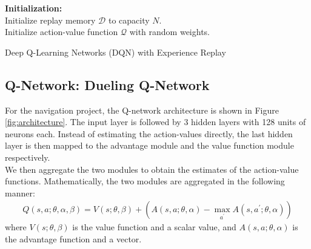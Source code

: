 \documentclass[12pt,twoside]{article}
\begin{document}
\begin{algorithm}[H]

\SetAlgoLined
\textbf{Initialization:}\\
Initialize replay memory $\mathcal{D}$ to capacity $N$.\\
Initialize action-value function $\mathcal{Q}$ with random weights.\

 \caption{Deep Q-Learning Networks (DQN) with Experience Replay}
\end{algorithm}

\subsection{Q-Network: Dueling Q-Network}

For the navigation project, the Q-network architecture is shown in Figure \ref{fig:architecture}. The input layer is followed by 3 hidden layers with 128 units of neurons each. Instead of estimating the action-values directly, the last hidden layer is then mapped to the advantage module and the value function module respectively. \\

We then aggregate the two modules to obtain the estimates of the action-value functions. Mathematically, the two modules are aggregated in the following manner:
\begin{align*}
	Q(s,a; \theta,\alpha, \beta) = V(s;\theta, \beta) + \left(A(s,a; \theta, \alpha) - \max_{a^\prime}A(s,a^\prime; \theta, \alpha) \right)
\end{align*}
where $V(s;\theta, \beta)$ is the value function and a scalar value, and $A(s,a; \theta, \alpha)$ is the advantage function and a vector.
\end{document}

